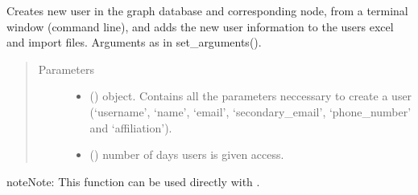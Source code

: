 \documentclass[letterpaper,10pt,english]{sphinxmanual}
\begin{document}
\begin{fulllineitems}
\label{\detokenize{_autosummary/graphdb_builder.builder:graphdb_builder.builder.create_user.create_user_from_command_line}}
Creates new user in the graph database and corresponding node, from a terminal window (command line),     and adds the new user information to the users excel and import files. Arguments as in set\_arguments().
\begin{quote}\begin{description}
\item[{Parameters}] \leavevmode\begin{itemize}
\item {} 
 () \textendash{} object. Contains all the parameters neccessary to create a user (‘username’, ‘name’, ‘email’,                 ‘secondary\_email’, ‘phone\_number’ and ‘affiliation’).

\item {} 
 () \textendash{} number of days users is given access.

\end{itemize}

\end{description}\end{quote}

\begin{sphinxadmonition}{note}{Note:}
This function can be used directly with  .
\end{sphinxadmonition}

\end{fulllineitems}

\end{document}
